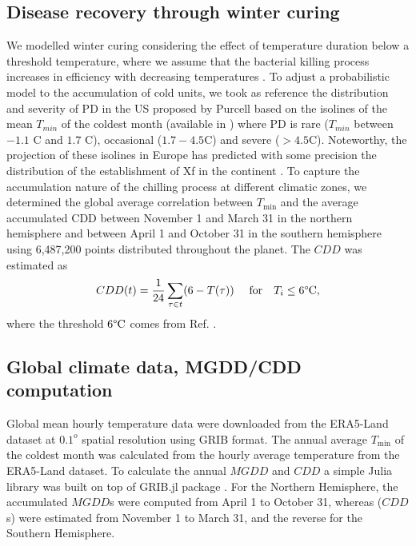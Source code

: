 \subsection{Disease recovery through winter curing}

We modelled winter curing considering the effect of temperature duration below
a threshold temperature, where we assume that the bacterial killing process
increases in efficiency with decreasing temperatures \cite{Lieth2011}. To
adjust a probabilistic model to the accumulation of cold units, we took as
reference the distribution and severity of PD in the US proposed by Purcell
based on the isolines of the mean $T_{ min}$ of the coldest month (available in
\cite{Anas2008}) where PD is rare ($T_{ min}$ between $-1.1$ \textdegree C and
$1.7$ \textdegree C), occasional ($1.7-4.5$\textdegree C) and severe ($>
    4.5$\textdegree C). Noteworthy, the projection of these isolines in Europe
has predicted with some precision the distribution of the establishment of Xf
in the continent \cite{Bragard2019}. To capture the accumulation nature of the
chilling process at different climatic zones, we determined the global average
correlation between $T_{\textrm{min}}$ and the average accumulated CDD between
November 1 and March 31 in the northern hemisphere and between April 1 and
October 31 in the southern hemisphere using 6,487,200 points distributed
throughout the planet. The $CDD$ was estimated as
\begin{equation}
    CDD(t)= \frac{1}{24}\sum_{\tau \in t} (6-T(\tau)) \ \quad \textrm{for}
    \quad T_i\le 6\textrm{\textdegree C} ,
\end{equation}
where the threshold $6 \textrm{\textdegree C}$ comes from Ref.
\cite{Lieth2011}.

\subsection{Global climate data, MGDD/CDD computation}

Global mean hourly temperature data were downloaded from the ERA5-Land
dataset \cite{ERA5_dataset} at $0.1^o$ spatial resolution using GRIB format.
The annual average $T_{\textrm{min}}$ of the coldest month was calculated from
the hourly average temperature from the ERA5-Land dataset. To calculate the
annual $MGDD$ and $CDD$ a simple Julia \cite{julia} library was built on top of
GRIB.jl package \cite{GRIB}. For the Northern Hemisphere, the accumulated
$MGDD$s were computed from April 1 to October 31, whereas ($CDD$s) were
estimated from November 1 to March 31, and the reverse for the Southern
Hemisphere.

